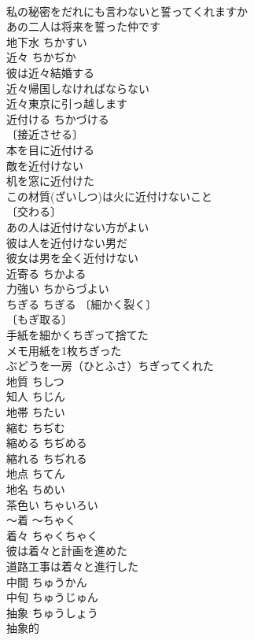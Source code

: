 \documentclass[8pt]{extreport}
\begin{document}
\begin{CJK}{UTF8}{min}
\\	私の秘密をだれにも言わないと誓ってくれますか 
\\	あの二人は将来を誓った仲です 
\\	地下水	ちかすい	
\\	近々	ちかぢか	
\\	彼は近々結婚する 
\\	近々帰国しなければならない 
\\	近々東京に引っ越します 
\\	近付ける	ちかづける	
\\	〔接近させる〕
\\	本を目に近付ける 
\\	敵を近付けない 
\\	机を窓に近付けた 
\\	この材質(ざいしつ)は火に近付けないこと 
\\	〔交わる〕
\\	あの人は近付けない方がよい 
\\	彼は人を近付けない男だ 
\\	彼女は男を全く近付けない 
\\	近寄る	ちかよる	
\\	力強い	ちからづよい	
\\	ちぎる	ちぎる	〔細かく裂く〕
\\	〔もぎ取る〕
\\	手紙を細かくちぎって捨てた 
\\	メモ用紙を1枚ちぎった 
\\	ぶどうを一房（ひとふさ）ちぎってくれた 
\\	地質	ちしつ	
\\	知人	ちじん	
\\	地帯	ちたい	
\\	縮む	ちぢむ	
\\	縮める	ちぢめる	
\\	縮れる	ちぢれる	
\\	地点	ちてん	
\\	地名	ちめい	
\\	茶色い	ちゃいろい	
\\	～着	～ちゃく	
\\	着々	ちゃくちゃく	
\\	彼は着々と計画を進めた 
\\	道路工事は着々と進行した 
\\	中間	ちゅうかん	
\\	中旬	ちゅうじゅん	
\\	抽象	ちゅうしょう	
\\	抽象的 

\end{CJK}
\end{document}
